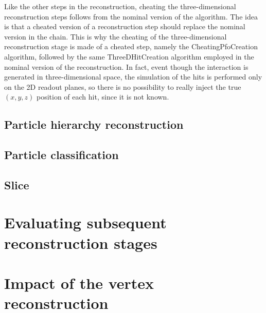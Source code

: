 Like the other steps in the reconstruction, cheating the three-dimensional reconstruction steps follows from the nominal version of the algorithm. The idea is that a cheated version of a reconstruction step should replace the nominal version in the chain. This is why the cheating of the three-dimensional reconstruction stage is made of a cheated step, namely the CheatingPfoCreation algorithm, followed by the same ThreeDHitCreation algorithm employed in the nominal version of the reconstruction. In fact, event though the interaction is generated in three-dimensional space, the simulation of the hits is performed only on the 2D readout planes, so there is no possibility to really inject the true $(x,y,z)$ position of each hit, since it is not known. 


\subsection{Particle hierarchy reconstruction}



\subsection{Particle classification}


\subsection{Slice }



\section{Evaluating subsequent reconstruction stages}



\section{Impact of the vertex reconstruction}

